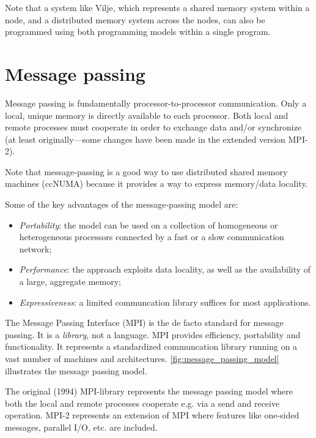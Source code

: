 Note that a system like Vilje, which represents a shared memory system within a
node, and a distributed memory system across the nodes, can also be programmed
using both programming models within a single program.

\section{Message passing}

Message passing is fundamentally processor-to-processor communication. Only a
local, unique memory is directly available to each processor. Both local and
remote processes must cooperate in order to exchange data and/or synchronize (at
least originally---some changes have been made in the extended version MPI-2).

Note that message-passing is a good way to use distributed shared memory
machines (ccNUMA) because it provides a way to express memory/data locality.

Some of the key advantages of the message-passing model are:
\begin{itemize}
\item {\em Portability}: the model can be used on a collection of
homogeneous or heterogeneous processors connected by a fast or a slow
communication network;
\item {\em Performance}: the approach exploits data locality, as well as the
availability of a large, aggregate memory;
\item {\em Expressiveness}: a limited communcation library suffices for most applications.
\end{itemize}

The Message Passing Interface (MPI) is the de facto standard for message
passing. It is a \emph{library}, not a language. MPI provides efficiency,
portability and functionality. It represents a standardized communcation library
running on a vast number of machines and architectures.
\autoref{fig:message_passing_model} illustrates the message passing model.

The original (1994) MPI-library represents the message passing model where both
the local and remote processes cooperate e.g. via a send and receive
operation. MPI-2 represents an extension of MPI where features like one-sided
messages, parallel I/O, etc. are included.

